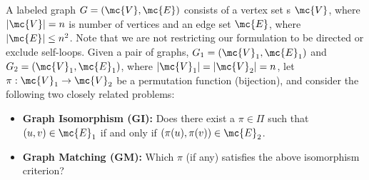 \documentclass[10pt,journal,cspaper,compsoc]{IEEEtran}
\newcommand{\PmcP}{P \in \mc{P}}
\begin{document}
A labeled graph $G=(\mc{V},\mc{E})$ consists of a vertex set s $\mc{V}$, where $|\mc{V}|=n$ is number of vertices and an edge set $\mc{E}$, where $|\mc{E}| \leq n^2$. Note that we are not restricting our formulation to be directed or exclude self-loops. Given a pair of graphs, $G_1=(\mc{V}_1,\mc{E}_1)$ and $G_2=(\mc{V}_1,\mc{E}_1)$, where $|\mc{V}_1|=|\mc{V}_2|=n$, 
let $\pi: \mc{V}_1 \to \mc{V}_2$ be a permutation function (bijection), and consider the following two closely related problems:
\begin{itemize}
	\item \textbf{Graph Isomorphism (GI):}  Does there exist a $\pi \in \Pi$ such that $(u,v) \in \mc{E}_1$ if and only if $(\pi(u),\pi(v)) \in \mc{E}_2$. 
		\item \textbf{Graph Matching (GM):} Which $\pi$ (if any) satisfies the above isomorphism criterion?
\end{itemize}

\end{document}
